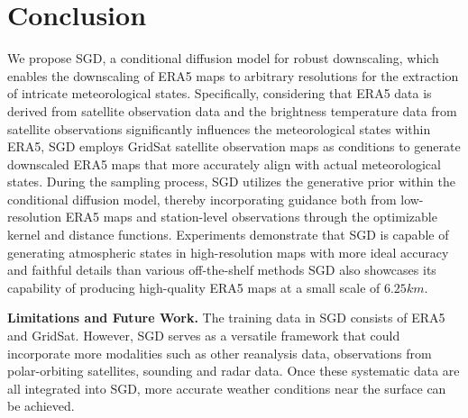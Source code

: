 \section{Conclusion}
We propose SGD, a conditional diffusion model for robust downscaling, which enables the downscaling of ERA5 maps to arbitrary resolutions for the extraction of intricate meteorological states. 
Specifically, considering that ERA5 data is derived from satellite observation data and the brightness temperature data from satellite observations significantly influences the meteorological states within ERA5, SGD employs GridSat satellite observation maps as conditions to generate downscaled ERA5 maps that more accurately align with actual meteorological states. 
During the sampling process, SGD utilizes the generative prior within the conditional diffusion model, thereby incorporating guidance both from low-resolution ERA5 maps and station-level observations through the optimizable kernel and distance functions. 
Experiments demonstrate that SGD is capable of generating atmospheric states in high-resolution maps with more ideal accuracy and faithful details than various off-the-shelf methods
SGD also showcases its capability of producing high-quality ERA5 maps at a small scale of $6.25km$. 

\noindent \textbf{Limitations and Future Work.}
The training data in SGD consists of ERA5 and GridSat.
However, SGD serves as a versatile framework that could incorporate more modalities such as other reanalysis data, observations from polar-orbiting satellites, sounding and radar data.
Once these systematic data are all integrated into SGD, more accurate weather conditions near the surface can be achieved.
